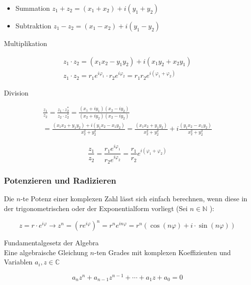 \begin{itemize}
  \item Summation $z_{1}+z_{2}=\left(x_{1}+x_{2}\right)+i\left(y_{1}+y_{2}\right)$
  \item Subtraktion $z_{1}-z_{2}=\left(x_{1}-x_{2}\right)+i\left(y_{1}-y_{2}\right)$
\end{itemize}

Multiplikation

$$
\begin{gathered}
z_{1} \cdot z_{2}=\left(x_{1} x_{2}-y_{1} y_{2}\right)+i\left(x_{1} y_{2}+x_{2} y_{1}\right) \\
z_{1} \cdot z_{2}=r_{1} e^{i \varphi_{1}} \cdot r_{2} e^{i \varphi_{2}}=r_{1} r_{2} e^{i\left(\varphi_{1}+\varphi_{2}\right)}
\end{gathered}
$$

Division

$$
\begin{gathered}
\frac{z_{1}}{z_{2}}=\frac{z_{1} \cdot z_{2}^{*}}{z_{2} \cdot z_{2}^{*}}=\frac{\left(x_{1}+i y_{1}\right)\left(x_{2}-i y_{2}\right)}{\left(x_{2}+i y_{2}\right)\left(x_{2}-i y_{2}\right)} \\
=\frac{\left(x_{1} x_{2}+y_{1} y_{2}\right)+i\left(y_{1} x_{2}-x_{1} y_{2}\right)}{x_{2}^{2}+y_{2}^{2}}=\frac{\left(x_{1} x_{2}+y_{1} y_{2}\right)}{x_{2}^{2}+y_{2}^{2}}+i \frac{\left(y_{1} x_{2}-x_{1} y_{2}\right)}{x_{2}^{2}+y_{2}^{2}}
\end{gathered}
$$

$$
\frac{z_{1}}{z_{2}}=\frac{r_{1} e^{i \varphi_{1}}}{r_{2} e^{i \varphi_{2}}}=\frac{r_{1}}{r_{2}} e^{i\left(\varphi_{1}+\varphi_{2}\right)}
$$

\subsubsection*{Potenzieren und Radizieren}
Die $n$-te Potenz einer komplexen Zahl lässt sich einfach berechnen, wenn diese in der trigonometrischen oder der Exponentialform vorliegt (Sei $n \in \mathbb{N}$ ):

$$
z=r \cdot e^{i \varphi} \rightarrow z^{n}=\left(r e^{i \varphi}\right)^{n}=r^{n} e^{i n \varphi}=r^{n}(\cos (n \varphi)+i \cdot \sin (n \varphi))
$$

Fundamentalgesetz der Algebra\\
Eine algebraische Gleichung $n$-ten Grades mit komplexen Koeffizienten und Variablen $a_{i}, z \in \mathbb{C}$

$$
a_{n} z^{n}+a_{n-1} z^{n-1}+\cdots+a_{1} z+a_{0}=0
$$

